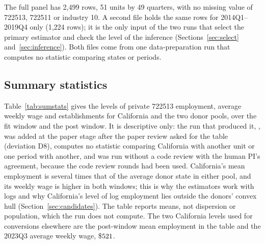 The full panel has 2,499 rows, 51 units by 49 quarters, with no missing value of 722513, 722511 or
industry 10. A second file holds the same rows for 2014Q1--2019Q4 only (1,224 rows); it is the
only input of the two runs that select the primary estimator and check the level of the inference
(Sections~\ref{sec:select} and~\ref{sec:inference}). Both files come from one data-preparation run
that computes no statistic comparing states or periods.

\subsection{Summary statistics}
\label{sec:sumstats}

Table~\ref{tab:sumstats} gives the levels of private 722513 employment, average weekly wage and
establishments for California and the two donor pools, over the fit window and the post window.
It is descriptive only: the run that produced it, , was added at the paper stage
after the paper review asked for the table (deviation D8), computes no statistic comparing
California with another unit or one period with another, and was run without a code review with
the human PI's agreement, because the code review rounds had been used. California's mean
employment is several times that of the average donor state in either pool, and its weekly wage
is higher in both windows; this is why the estimators work with logs and why California's level
of log employment lies outside the donors' convex hull (Section~\ref{sec:candidates}). The table
reports means, not dispersion or population, which the run does not compute. The two California
levels used for conversions elsewhere are the post-window mean employment in the table and the
2023Q3 average weekly wage, \$$521$.

